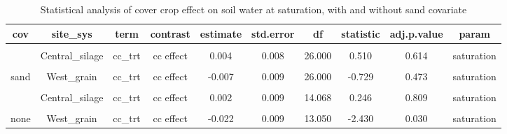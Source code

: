 \documentclass[
]{article}
\begin{document}
\begin{table}[H]

\caption{\label{tab:sat}Statistical analysis of cover crop effect on soil water at saturation, with and without sand covariate}
\centering
\begin{tabular}[t]{cccccccccc}
\toprule
cov & site\_sys & term & contrast & estimate & std.error & df & statistic & adj.p.value & param\\
\midrule
\cellcolor{gray!6}{sand} & \cellcolor{gray!6}{Central\_grain} & \cellcolor{gray!6}{cc\_trt} & \cellcolor{gray!6}{cc effect} & \cellcolor{gray!6}{-0.013} & \cellcolor{gray!6}{0.008} & \cellcolor{gray!6}{26.000} & \cellcolor{gray!6}{-1.688} & \cellcolor{gray!6}{0.103} & \cellcolor{gray!6}{saturation}\\
 & Central\_silage & cc\_trt & cc effect & 0.004 & 0.008 & 26.000 & 0.510 & 0.614 & saturation\\

\cellcolor{gray!6}{sand} & \cellcolor{gray!6}{East\_grain} & \cellcolor{gray!6}{cc\_trt} & \cellcolor{gray!6}{cc effect} & \cellcolor{gray!6}{0.011} & \cellcolor{gray!6}{0.009} & \cellcolor{gray!6}{26.000} & \cellcolor{gray!6}{1.271} & \cellcolor{gray!6}{0.215} & \cellcolor{gray!6}{saturation}\\
\multirow{-4}{*}{\centering\arraybackslash sand} & West\_grain & cc\_trt & cc effect & -0.007 & 0.009 & 26.000 & -0.729 & 0.473 & saturation\\
\cmidrule{1-10}
\cellcolor{gray!6}{none} & \cellcolor{gray!6}{Central\_grain} & \cellcolor{gray!6}{cc\_trt} & \cellcolor{gray!6}{cc effect} & \cellcolor{gray!6}{-0.016} & \cellcolor{gray!6}{0.008} & \cellcolor{gray!6}{13.050} & \cellcolor{gray!6}{-1.959} & \cellcolor{gray!6}{0.072} & \cellcolor{gray!6}{saturation}\\
 & Central\_silage & cc\_trt & cc effect & 0.002 & 0.009 & 14.068 & 0.246 & 0.809 & saturation\\

\cellcolor{gray!6}{none} & \cellcolor{gray!6}{East\_grain} & \cellcolor{gray!6}{cc\_trt} & \cellcolor{gray!6}{cc effect} & \cellcolor{gray!6}{0.002} & \cellcolor{gray!6}{0.009} & \cellcolor{gray!6}{13.050} & \cellcolor{gray!6}{0.228} & \cellcolor{gray!6}{0.823} & \cellcolor{gray!6}{saturation}\\
\multirow{-4}{*}{\centering\arraybackslash none} & West\_grain & cc\_trt & cc effect & -0.022 & 0.009 & 13.050 & -2.430 & 0.030 & saturation\\
\bottomrule
\end{tabular}
\end{table}
\end{document}
